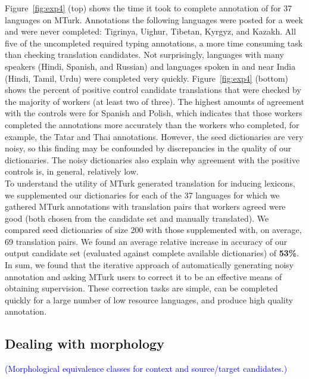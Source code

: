 \documentclass{article}
\newcommand{\todo}[1]{\textcolor{blue}{(#1)}}
\newcommand{\figref}[1]{Figure~\ref{#1}}
\begin{document}
\figref{fig:exp4} (top) shows the time it took to complete annotation of for 37 languages on MTurk. Annotations the following languages were posted for a week and were never completed: Tigrinya, Uighur, Tibetan, Kyrgyz, and Kazakh. All five of the uncompleted required typing annotations, a more time consuming task than checking translation candidates. Not surprisingly, languages with many speakers (Hindi, Spanish, and Russian) and languages spoken in and near India (Hindi, Tamil, Urdu) were completed very quickly. \figref{fig:exp4} (bottom) shows the percent of positive control candidate translations that were checked by the majority of workers (at least two of three). The highest amounts of agreement with the controls were for Spanish and Polish, which indicates that those workers completed the annotations more accurately than the workers who completed, for example, the Tatar and Thai annotations. However, the seed dictionaries are very noisy, so this finding may be confounded by discrepancies in the quality of our dictionaries. The noisy dictionaries also explain why agreement with the positive controls is, in general, relatively low.\\

To understand the utility of MTurk generated translation for inducing lexicons, we supplemented our dictionaries for each of the 37 languages for which we gathered MTurk annotations with translation pairs that workers agreed were good (both chosen from the candidate set and manually translated). We compared seed dictionaries of size 200 with those supplemented with, on average, 69 translation pairs. We found an average relative increase in accuracy of our output candidate set (evaluated against complete available dictionaries) of {\bf 53\%}.\\

In sum, we found that the iterative approach of automatically generating noisy annotation and asking MTurk users to correct it to be an effective means of obtaining supervision.  These correction tasks are simple, can be completed quickly for a large number of low resource languages, and produce high quality annotation.

\subsection{Dealing with morphology}

\todo{Morphological equivalence classes for context and source/target candidates.}

\end{document}
